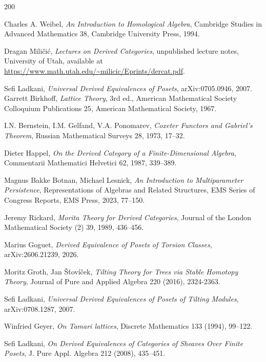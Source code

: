 

\begin{thebibliography}{200}
    

    Charles A. Weibel, \textit{An Introduction to Homological Algebra}, Cambridge Studies in Advanced Mathematics 38, Cambridge University Press, 1994.

    Dragan Mili\v{c}i\'{c}, \textit{Lectures on Derived Categories}, unpublished lecture notes, University of Utah, available at \url{https://www.math.utah.edu/~milicic/Eprints/dercat.pdf}.
    
    Sefi Ladkani, \textit{Universal Derived Equivalences of Posets}, arXiv:0705.0946, 2007.
    Garrett Birkhoff, \textit{Lattice Theory}, 3rd ed., American Mathematical Society Colloquium Publications 25, American Mathematical Society, 1967.

     I.N. Bernstein, I.M. Gelfand, V.A. Ponomarev, \textit{Coxeter Functors and Gabriel's Theorem}, Russian Mathematical Surveys 28, 1973, 17--32.

     Dieter Happel, \textit{On the Derived Category of a Finite-Dimensional Algebra}, Commentarii Mathematici Helvetici 62, 1987, 339--389.

     Magnus Bakke Botnan, Michael Lesnick, \textit{An Introduction to Multiparameter Persistence}, Representations of Algebras and Related Structures, EMS Series of Congress Reports, EMS Press, 2023, 77--150.

 Jeremy Rickard, \textit{Morita Theory for Derived Categories}, Journal of the London Mathematical Society (2) 39, 1989, 436--456.

    Marius Goguet, \textit{Derived Equivalence of Posets of Torsion Classes}, arXiv:2606.21239, 2026.

    Moritz Groth, Jan Šťovíček, \textit{Tilting Theory for Trees via Stable Homotopy Theory}, Journal of Pure and Applied Algebra 220 (2016), 2324-2363.
  
    Sefi Ladkani, \textit{Universal Derived Equivalences of Posets of Tilting Modules}, arXiv:0708.1287, 2007.

 Winfried Geyer, \textit{On Tamari lattices}, Discrete Mathematics 133 (1994), 99--122.
    

     Sefi Ladkani, \textit{On Derived Equivalences of Categories of Sheaves Over Finite Posets}, J. Pure Appl. Algebra 212 (2008), 435--451.

    \end{thebibliography}